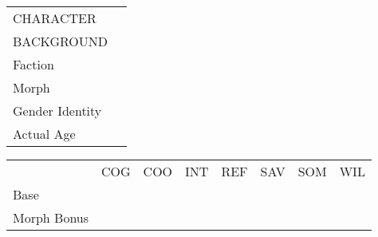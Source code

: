 \documentclass{article}
\begin{document}
    \begin{multicols}{2}
        \begin{tabular}{ll}
            CHARACTER & \\
            BACKGROUND & \\
            Faction & \\
            Morph & \\
            Gender Identity & \\
            Actual Age & \\
        \end{tabular}
        \columnbreak
        \begin{flushright}
        \begin{tabular}{lccccccc}
            & COG & COO & INT & REF & SAV & SOM & WIL \\
            Base \\
            Morph Bonus \\
        \end{tabular}
    \end{flushright}
    \end{multicols}
\end{document}
